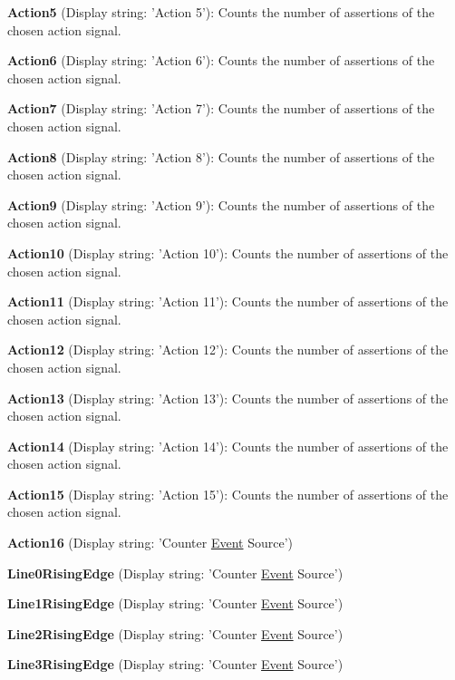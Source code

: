 \begin{DoxyItemize}
\item {\bfseries Action5} (Display string\+: 'Action 5')\+: Counts the number of assertions of the chosen action signal.
\item {\bfseries Action6} (Display string\+: 'Action 6')\+: Counts the number of assertions of the chosen action signal.
\item {\bfseries Action7} (Display string\+: 'Action 7')\+: Counts the number of assertions of the chosen action signal.
\item {\bfseries Action8} (Display string\+: 'Action 8')\+: Counts the number of assertions of the chosen action signal.
\item {\bfseries Action9} (Display string\+: 'Action 9')\+: Counts the number of assertions of the chosen action signal.
\item {\bfseries Action10} (Display string\+: 'Action 10')\+: Counts the number of assertions of the chosen action signal.
\item {\bfseries Action11} (Display string\+: 'Action 11')\+: Counts the number of assertions of the chosen action signal.
\item {\bfseries Action12} (Display string\+: 'Action 12')\+: Counts the number of assertions of the chosen action signal.
\item {\bfseries Action13} (Display string\+: 'Action 13')\+: Counts the number of assertions of the chosen action signal.
\item {\bfseries Action14} (Display string\+: 'Action 14')\+: Counts the number of assertions of the chosen action signal.
\item {\bfseries Action15} (Display string\+: 'Action 15')\+: Counts the number of assertions of the chosen action signal.
\item {\bfseries Action16} (Display string\+: 'Counter \hyperlink{classmv_i_m_p_a_c_t_1_1acquire_1_1_event}{Event} Source')
\item {\bfseries Line0\+Rising\+Edge} (Display string\+: 'Counter \hyperlink{classmv_i_m_p_a_c_t_1_1acquire_1_1_event}{Event} Source')
\item {\bfseries Line1\+Rising\+Edge} (Display string\+: 'Counter \hyperlink{classmv_i_m_p_a_c_t_1_1acquire_1_1_event}{Event} Source')
\item {\bfseries Line2\+Rising\+Edge} (Display string\+: 'Counter \hyperlink{classmv_i_m_p_a_c_t_1_1acquire_1_1_event}{Event} Source')
\item {\bfseries Line3\+Rising\+Edge} (Display string\+: 'Counter \hyperlink{classmv_i_m_p_a_c_t_1_1acquire_1_1_event}{Event} Source')

\end{DoxyItemize}
